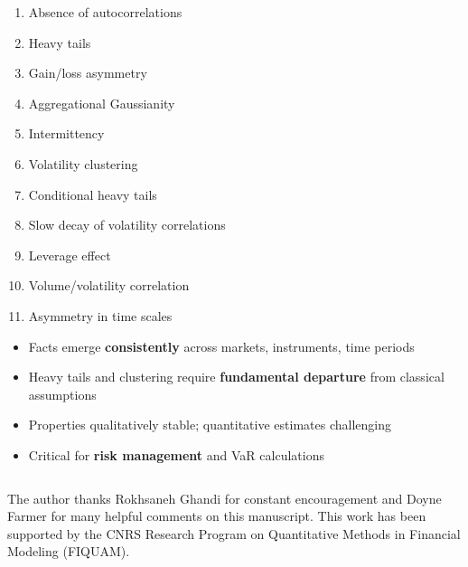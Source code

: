 \documentclass[final]{beamer}
\begin{document}
\begin{frame}[t]
\begin{columns}[t]
\begin{column}{.48\linewidth}
\vspace{0.5cm}

\begin{tcolorbox}[mybox, title=The 11 Stylized Facts]
\large
\begin{enumerate}
\item Absence of autocorrelations
\item Heavy tails %
\item Gain/loss asymmetry
\item Aggregational Gaussianity
\item Intermittency
\item Volatility clustering
\item Conditional heavy tails
\item Slow decay of volatility correlations
\item Leverage effect
\item Volume/volatility correlation
\item Asymmetry in time scales
\end{enumerate}

\end{tcolorbox}

\vspace{0.5cm}

\begin{tcolorbox}[mybox, title=Results \& Conclusions]
\large
\begin{itemize}
\item Facts emerge \textbf{consistently} across markets, instruments, time periods
\item Heavy tails and clustering require \textbf{fundamental departure} from classical assumptions
\item Properties qualitatively stable; quantitative estimates challenging
\item Critical for \textbf{risk management} and VaR calculations
\end{itemize}
\end{tcolorbox}


\vspace{0.5cm}



\end{column}
\end{columns}

\begin{tcolorbox}[mybox, title=Acknowledgments]
\large
The author thanks Rokhsaneh Ghandi for constant encouragement and Doyne Farmer for many helpful comments on this
manuscript. This work has been supported by the CNRS Research Program on Quantitative Methods in Financial Modeling (FIQUAM).


\end{tcolorbox}
\end{frame}
\end{document}
